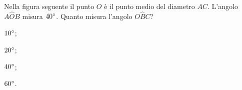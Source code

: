 \noindent\begin{minipage}{0.65\textwidth}\parindent15pt
\begin{esercizio}
\label{ese:5.68}
Nella figura seguente il punto $O$ è il punto medio del diametro $AC$. L'angolo $A\widehat{O}B$ misura $40{}^{\circ}$. Quanto misura l'angolo $O\widehat{B}C$? 
\begin{multicols}{4}
\begin{enumeratea}
\item $10{}^{\circ}$;
\item $20{}^{\circ}$;
\item $40{}^{\circ}$;
\item $60{}^{\circ}$.
\end{enumeratea}
\end{multicols}
\end{esercizio}
\end{minipage}\hfil
\begin{minipage}{0.35\textwidth}
	\centering
\end{minipage}\vspace{5pt}
